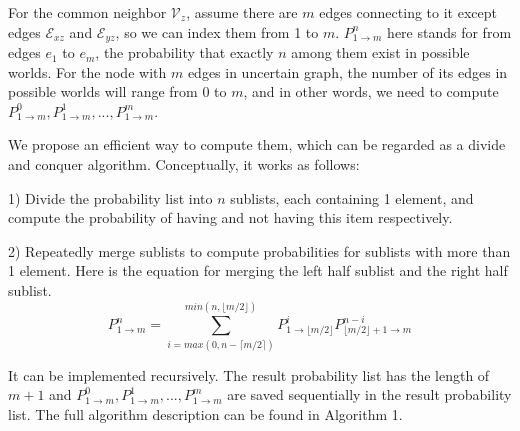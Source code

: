 \documentclass[\main/thesis.tex]{subfiles}
\begin{document}

For the common neighbor $\mathcal{V}_z$, assume there are $m$ edges connecting to it except edges $\mathcal{E}_{xz}$ and $\mathcal{E}_{yz}$, so we can index them from 1 to $m$. $P_{1\rightarrow m}^n$ here stands for from edges $e_1$ to $e_m$, the probability that exactly $n$ among them exist in possible worlds. For the node with $m$ edges in uncertain graph, the number of its edges in possible worlds will range from 0 to $m$, and in other words, we need to compute $P_{1\rightarrow m}^0, P_{1\rightarrow m}^1, ..., P_{1\rightarrow m}^m$. 

We propose an efficient way to compute them, which can be regarded as a divide and conquer algorithm. Conceptually, it works as follows:

1) Divide the probability list into $n$ sublists, each containing 1 element, and compute the probability of having and not having this item respectively.

2) Repeatedly merge sublists to compute probabilities for sublists with more than 1 element. Here is the equation for merging the left half sublist and the right half sublist.
\begin{equation}
P_{1\rightarrow m}^n=\sum_{i=max(0,n-\lceil m/2 \rceil)}^{min(n,\lfloor m/2 \rfloor)}P_{1\rightarrow{\lfloor m/2 \rfloor}}^i P_{{\lfloor m/2 \rfloor}+1\rightarrow m}^{n-i}
\end{equation}

It can be implemented recursively. The result probability list has the length of $m+1$ and $P_{1\rightarrow m}^0, P_{1\rightarrow m}^1, ..., P_{1\rightarrow m}^m$ are saved sequentially in the result probability list. The full algorithm description can be found in Algorithm 1.
\end{document}
